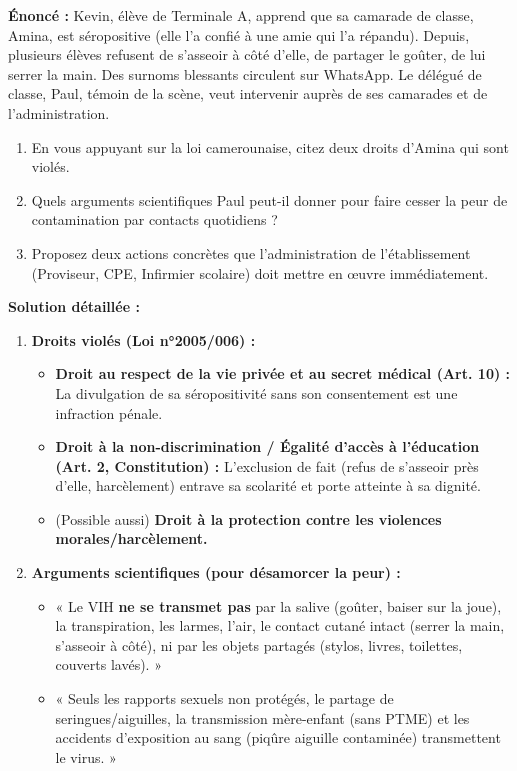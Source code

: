 \documentclass[11pt]{article}
\begin{document}
\begin{exoresolu}
\textbf{Énoncé :} Kevin, élève de Terminale A, apprend que sa camarade de classe, Amina, est séropositive (elle l'a confié à une amie qui l'a répandu). Depuis, plusieurs élèves refusent de s'asseoir à côté d'elle, de partager le goûter, de lui serrer la main. Des surnoms blessants circulent sur WhatsApp. Le délégué de classe, Paul, témoin de la scène, veut intervenir auprès de ses camarades et de l'administration.
\begin{enumerate}
    \item En vous appuyant sur la loi camerounaise, citez deux droits d'Amina qui sont violés.
    \item Quels arguments scientifiques Paul peut-il donner pour faire cesser la peur de contamination par contacts quotidiens ?
    \item Proposez deux actions concrètes que l'administration de l'établissement (Proviseur, CPE, Infirmier scolaire) doit mettre en œuvre immédiatement.
\end{enumerate}
\tcblower
\textbf{Solution détaillée :}
\begin{enumerate}
    \item \textbf{Droits violés (Loi n°2005/006) :}
    \begin{itemize}
        \item \textbf{Droit au respect de la vie privée et au secret médical (Art. 10) :} La divulgation de sa séropositivité sans son consentement est une infraction pénale.
        \item \textbf{Droit à la non-discrimination / Égalité d'accès à l'éducation (Art. 2, Constitution) :} L'exclusion de fait (refus de s'asseoir près d'elle, harcèlement) entrave sa scolarité et porte atteinte à sa dignité.
        \item (Possible aussi) \textbf{Droit à la protection contre les violences morales/harcèlement.}
    \end{itemize}
    \item \textbf{Arguments scientifiques (pour désamorcer la peur) :}
    \begin{itemize}
        \item « Le VIH \textbf{ne se transmet pas} par la salive (goûter, baiser sur la joue), la transpiration, les larmes, l'air, le contact cutané intact (serrer la main, s'asseoir à côté), ni par les objets partagés (stylos, livres, toilettes, couverts lavés). »
        \item « Seuls les rapports sexuels non protégés, le partage de seringues/aiguilles, la transmission mère-enfant (sans PTME) et les accidents d'exposition au sang (piqûre aiguille contaminée) transmettent le virus. »

\end{itemize}
\end{enumerate}
\end{exoresolu}
\end{document}
